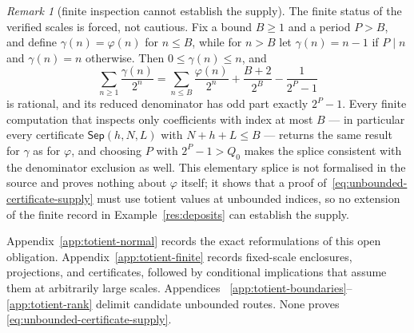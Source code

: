 \documentclass[11pt]{article}
\theoremstyle{definition}
\theoremstyle{remark}
\newtheorem*{remark}{Remark}
\newcommand{\ph}{\varphi}
\newcommand{\Qzero}{Q_0}
\begin{document}
\begin{remark}[finite inspection cannot establish the supply]
The finite status of the verified scales is forced, not cautious.  Fix a
bound \(B\ge1\) and a period \(P>B\), and define \(\gamma(n)=\ph(n)\) for
\(n\le B\), while for \(n>B\) let \(\gamma(n)=n-1\) if \(P\mid n\) and
\(\gamma(n)=n\) otherwise.  Then \(0\le\gamma(n)\le n\), and
\[
 \sum_{n\ge1}\frac{\gamma(n)}{2^n}
 =\sum_{n\le B}\frac{\ph(n)}{2^n}+\frac{B+2}{2^B}-\frac1{2^P-1}
\]
is rational, and its reduced denominator has odd part exactly \(2^P-1\).  Every
finite computation that inspects only coefficients with index at most \(B\)
--- in particular every certificate \(\mathsf{Sep}(h,N,L)\) with
\(N+h+L\le B\) --- returns the same result for \(\gamma\) as for \(\ph\),
and choosing \(P\) with \(2^P-1>\Qzero\) makes the splice consistent with
the denominator exclusion as well.  This elementary splice is not formalised
in the source and proves nothing about \(\ph\) itself; it shows that a proof
of~\eqref{eq:unbounded-certificate-supply} must use totient values at
unbounded indices, so no extension of the finite record in
Example~\ref{res:deposits} can establish the supply.
\end{remark}

Appendix~\ref{app:totient-normal} records the exact reformulations of this
open obligation.  Appendix~\ref{app:totient-finite} records fixed-scale
enclosures, projections, and certificates, followed by conditional
implications that assume them at arbitrarily large scales.  Appendices~
\ref{app:totient-boundaries}--\ref{app:totient-rank} delimit candidate
unbounded routes.  None proves \eqref{eq:unbounded-certificate-supply}.
\end{document}
